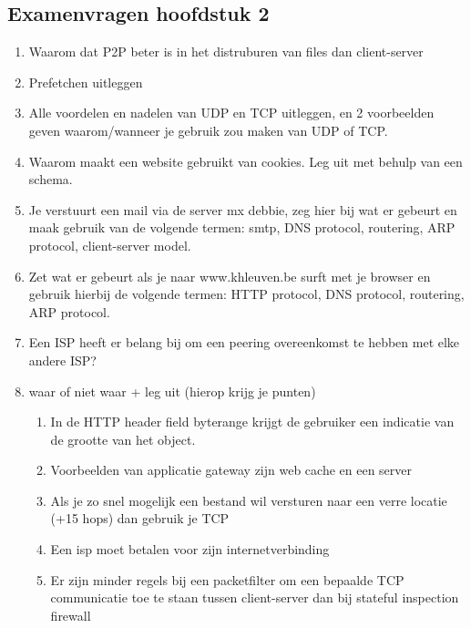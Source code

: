 \subsection{Examenvragen hoofdstuk 2}
\begin{enumerate}
\item Waarom dat P2P beter is in het distruburen van files dan client-server

\item Prefetchen uitleggen

\item Alle voordelen en nadelen van UDP en TCP uitleggen, en 2 voorbeelden geven waarom/wanneer je gebruik zou maken van UDP of TCP.

\item Waarom maakt een website gebruikt van cookies. Leg uit met behulp van een schema.

\item Je verstuurt een mail via de server mx debbie, zeg hier bij wat er gebeurt en maak gebruik van de volgende termen: smtp, DNS protocol, routering, ARP protocol, client-server model.

\item Zet wat er gebeurt als je naar www.khleuven.be surft met je browser en gebruik hierbij de volgende termen: HTTP protocol, DNS protocol, routering, ARP protocol.

\item Een ISP heeft er belang bij om een peering overeenkomst te hebben met elke andere ISP?

\item waar of niet waar + leg uit (hierop krijg je punten)

    \begin{enumerate}
        \item In de HTTP header field byterange krijgt de gebruiker een indicatie van de grootte van het object.

        \item Voorbeelden van applicatie gateway zijn web cache en een server

        \item Als je zo snel mogelijk een bestand wil versturen naar een verre locatie (+15 hops) dan gebruik je TCP

        \item Een isp moet betalen voor zijn internetverbinding

        \item Er zijn minder regels bij een packetfilter om een bepaalde TCP communicatie toe te staan tussen client-server dan bij stateful inspection firewall


\end{enumerate}
\end{enumerate}
